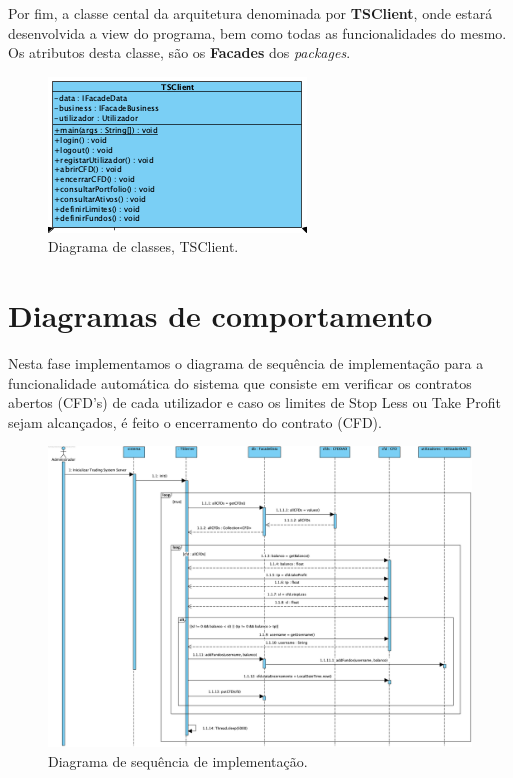 \documentclass[11pt,a4paper]{report}%
\begin{document}
Por fim, a classe cental da arquitetura denominada por \textbf{TSClient}, onde estará desenvolvida a view do programa, bem como todas as funcionalidades do mesmo. Os atributos desta classe, são os \textbf{Facades} dos \emph{packages}.

\begin{figure}[H]
	\centering
	\includegraphics[scale=0.5]{diagrama-classes-6.png}
	\caption{Diagrama de classes, TSClient. }
	\label{img:pag}
\end{figure}

\newpage

\section{Diagramas de comportamento}

Nesta fase implementamos o diagrama de sequência de implementação para a funcionalidade automática do sistema que consiste em verificar os contratos abertos (CFD's) de cada utilizador e caso os limites de Stop Less ou Take Profit sejam alcançados, é feito o encerramento do contrato (CFD).

\begin{figure}[H]
	\centering
	\includegraphics[scale=0.5]{Inicializar_Trading_System_Server.png}
	\caption{Diagrama de sequência de implementação. }
	\label{img:pag}
\end{figure}
\end{document}
